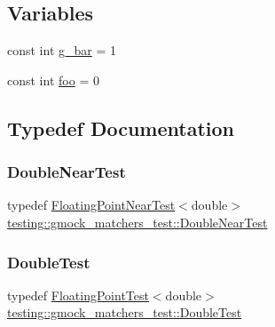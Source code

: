 \subsection*{Variables}
\begin{DoxyCompactItemize}
\item 
const int \mbox{\hyperlink{namespacetesting_1_1gmock__matchers__test_a55dcc962203a3a3361d2e7e00ed99b4d}{g\+\_\+bar}} = 1
\item 
const int \mbox{\hyperlink{namespacetesting_1_1gmock__matchers__test_a3536e68112ffbb1f76887cd15bb45c15}{foo}} = 0
\end{DoxyCompactItemize}


\subsection{Typedef Documentation}
\mbox{\label{namespacetesting_1_1gmock__matchers__test_aea537d0183ccc65b5c49a75d711993c8}} 
\subsubsection{\texorpdfstring{DoubleNearTest}{DoubleNearTest}}
{\footnotesize\ttfamily typedef \mbox{\hyperlink{classtesting_1_1gmock__matchers__test_1_1FloatingPointNearTest}{Floating\+Point\+Near\+Test}}$<$double$>$ \mbox{\hyperlink{namespacetesting_1_1gmock__matchers__test_aea537d0183ccc65b5c49a75d711993c8}{testing\+::gmock\+\_\+matchers\+\_\+test\+::\+Double\+Near\+Test}}}

\mbox{\label{namespacetesting_1_1gmock__matchers__test_a944cdd366ed240f29ae8e3ebc753ad5c}} 
\subsubsection{\texorpdfstring{DoubleTest}{DoubleTest}}
{\footnotesize\ttfamily typedef \mbox{\hyperlink{classtesting_1_1gmock__matchers__test_1_1FloatingPointTest}{Floating\+Point\+Test}}$<$double$>$ \mbox{\hyperlink{namespacetesting_1_1gmock__matchers__test_a944cdd366ed240f29ae8e3ebc753ad5c}{testing\+::gmock\+\_\+matchers\+\_\+test\+::\+Double\+Test}}}

